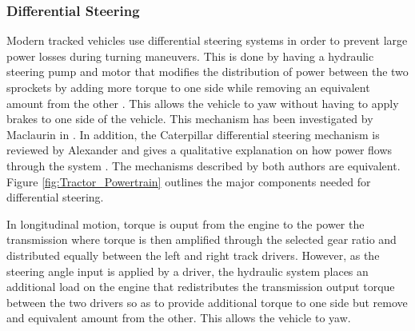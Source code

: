 \subsubsection{Differential Steering}
Modern tracked vehicles use differential steering systems in order to prevent large power losses during turning maneuvers. This is done by having a hydraulic steering pump and motor that modifies the distribution of power between the two sprockets by adding more torque to one side while removing an equivalent amount from the other \cite{alexander1987caterpillar,maclaurin2011skid,maclaurin2007skid}. This allows the vehicle to yaw without having to apply brakes to one side of the vehicle. This mechanism has been investigated by Maclaurin in \cite{maclaurin2011skid,maclaurin2007skid}. In addition, the Caterpillar differential steering mechanism is reviewed by Alexander and gives a qualitative explanation on how power flows through the system \cite{alexander1987caterpillar}. The mechanisms described by both authors are equivalent. Figure \ref{fig:Tractor_Powertrain} outlines the major components needed for differential steering.

In longitudinal motion, torque is ouput from the engine to the power the transmission where torque is then amplified through the selected gear ratio and distributed equally between the left and right track drivers. However, as the steering angle input is applied by a driver, the hydraulic system places an additional load on the engine that redistributes the transmission output torque between the two drivers so as to provide additional torque to one side but remove and equivalent amount from the other. This allows the vehicle to yaw.

